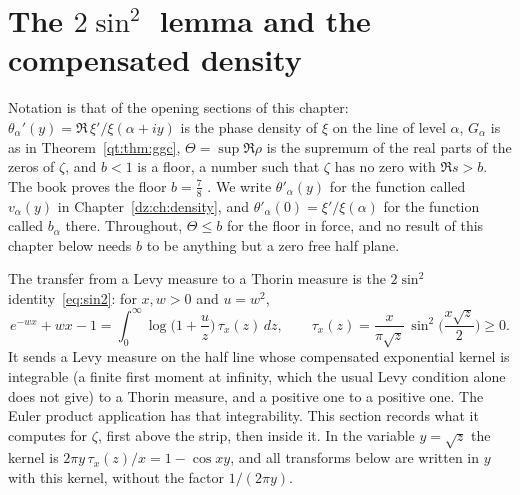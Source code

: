 \section{The \texorpdfstring{$2\sin^2$}{2 sin2} lemma and the compensated density}\label{qt:sec:comp}

Notation is that of the opening sections of this chapter: $\theta_\alpha'(y)=\Re\,\xi'/\xi(\alpha+iy)$ is the phase density of $\xi$ on the line of level $\alpha$, $G_\alpha$ is as in Theorem~\ref{qt:thm:ggc}, $\Theta=\sup\Re\rho$ is the supremum of the real parts of the zeros of $\zeta$, and $b<1$ is a floor, a number such that $\zeta$ has no zero with $\Re s>b$. The book proves the floor $b=\tfrac78$ \cite{OAI26a}. We write $\theta'_\alpha(y)$ for the function called $v_\alpha(y)$ in Chapter~\ref{dz:ch:density}, and $\theta'_\alpha(0)=\xi'/\xi(\alpha)$ for the function called $b_\alpha$ there. Throughout, $\Theta\le b$ for the floor in force, and no result of this chapter below needs $b$ to be anything but a zero free half plane.

The transfer from a Levy measure to a Thorin measure is the $2\sin^2$ identity~\eqref{eq:sin2}: for $x,w>0$ and $u=w^2$,
\[
e^{-wx}+wx-1=\int_0^\infty\log\Big(1+\frac uz\Big)\,\tau_x(z)\,dz,\qquad\tau_x(z)=\frac{x}{\pi\sqrt z}\,\sin^2\!\Big(\frac{x\sqrt z}2\Big)\ge0 .
\]
It sends a Levy measure on the half line whose compensated exponential kernel is integrable (a finite first moment at infinity, which the usual Levy condition alone does not give) to a Thorin measure, and a positive one to a positive one. The Euler product application has that integrability. This section records what it computes for $\zeta$, first above the strip, then inside it. In the variable $y=\sqrt z$ the kernel is $2\pi y\,\tau_x(z)/x=1-\cos xy$, and all transforms below are written in $y$ with this kernel, without the factor $1/(2\pi y)$.

